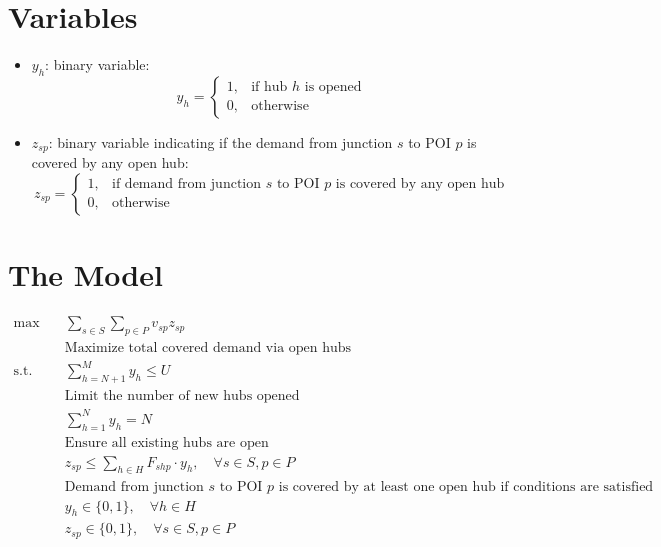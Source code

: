 \documentclass{article}
\begin{document}
\section{Variables}
\begin{itemize}[leftmargin=*,nosep]
    \item $y_h$: binary variable:
        \[
        y_h = \begin{cases} 
        1, & \text{if hub } h \text{ is opened} \\
        0, & \text{otherwise}
        \end{cases}
        \]
    \item $z_{sp}$: binary variable indicating if the demand from junction $s$ to POI $p$ is covered by any open hub:
        \[
        z_{sp} = \begin{cases} 
        1, & \text{if demand from junction } s \text{ to POI } p \text{ is covered by any open hub} \\
        0, & \text{otherwise}
        \end{cases}
        \]
\end{itemize}

\section{The Model}
\begin{align*}
    \max \quad & \sum_{s \in S} \sum_{p \in P} v_{sp} z_{sp} \\
    & \text{Maximize total covered demand via open hubs} \\[6pt]
    \text{s.t.} \quad & \sum_{h = N+1}^{M} y_h \leq U \\
    & \text{Limit the number of new hubs opened} \\[6pt]
    & \sum_{h = 1}^{N} y_h = N \\
    & \text{Ensure all existing hubs are open} \\[6pt]
    & z_{sp} \leq \sum_{h \in H} F_{shp} \cdot y_h, \quad \forall s \in S, p \in P \\
    & \text{Demand from junction } s \text{ to POI } p \text{ is covered by at least one open hub if conditions are satisfied} \\[6pt]
    & y_h \in \{0, 1\}, \quad \forall h \in H \\
    & z_{sp} \in \{0, 1\}, \quad \forall s \in S, p \in P
\end{align*}
\end{document}
